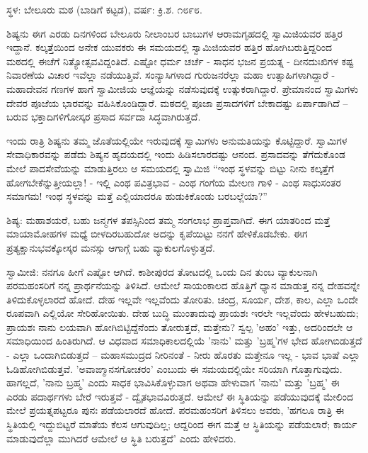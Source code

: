 \begin{center}
ಸ್ಥಳ: ಬೇಲೂರು ಮಠ (ಬಾಡಿಗೆ ಕಟ್ಟಡ), ವರ್ಷ: ಕ್ರಿ.ಶ. ೧೮೯೮.
\end{center}

ಶಿಷ್ಯನು ಈಗ ಎರಡು ದಿನಗಳಿಂದ ಬೇಲೂರು ನೀಲಾಂಬರ ಬಾಬುಗಳ ಆರಾಮಗೃಹದಲ್ಲಿ ಸ್ವಾಮಿಜಿಯವರ ಹತ್ತಿರ ಇದ್ದಾನೆ. ಕಲ್ಕತ್ತೆಯಿಂದ ಅನೇಕ ಯುವಕರು ಈ ಸಮಯದಲ್ಲಿ ಸ್ವಾಮಿಜಿಯವರ ಹತ್ತಿರ ಹೋಗಿಬರುತ್ತಿದ್ದರಿಂದ ಮಠದಲ್ಲಿ ಈಚೆಗೆ ನಿತ್ಯೋತ್ಸವವಿದ್ದಂತಿದೆ. ಎಷ್ಟೋ ಧರ್ಮ ಚರ್ಚೆ - ಸಾಧನ ಭಜನ ಪ್ರಯತ್ನ - ದೀನದುಃಖಿಗಳ ಕಷ್ಟ ನಿವಾರಣೆಯ ವಿಚಾರ ಇವೆಲ್ಲಾ ನಡೆಯುತ್ತಿವೆ. ಸಂನ್ಯಾಸಿಗಳಾದ ಗುರುಜನರೆಲ್ಲಾ ಮಹಾ ಉತ್ಸಾಹಿಗಳಾಗಿದ್ದಾರೆ - ಮಹಾದೇವನ ಗಣಗಳ ಹಾಗೆ ಸ್ವಾಮೀಜಿಯ ಆಜ್ಞೆಯನ್ನು ನಡೆಸುವುದಕ್ಕೆ ಉತ್ಸುಕರಾಗಿದ್ದಾರೆ. ಪ್ರೇಮಾನಂದ ಸ್ವಾಮಿಗಳು ದೇವರ ಪೂಜೆಯ ಭಾರವನ್ನು ವಹಿಸಿಕೊಂಡಿದ್ದಾರೆ. ಮಠದಲ್ಲಿ ಪೂಜಾ ಪ್ರಸಾದಗಳಿಗೆ ಬೇಕಾದಷ್ಟು ಏರ್ಪಾಡಾಗಿದೆ – ಬರುವ ಭಕ್ತಾದಿಗಳಿಗೋಸ್ಕರ ಪ್ರಸಾದ ಸರ್ವದಾ ಸಿದ್ಧವಾಗಿರುತ್ತದೆ.

ಇಂದು ರಾತ್ರಿ ಶಿಷ್ಯನು ತಮ್ಮ ಜೊತೆಯಲ್ಲಿಯೇ ಇರುವುದಕ್ಕೆ ಸ್ವಾಮಿಗಳು ಅನುಮತಿಯನ್ನು ಕೊಟ್ಟಿದ್ದಾರೆ. ಸ್ವಾಮಿಗಳ ಸೇವಾಧಿಕಾರವನ್ನು ಪಡೆದು ಶಿಷ್ಯನ ಹೃದಯದಲ್ಲಿ ಇಂದು ಹಿಡಿಸಲಾರದಷ್ಟು ಆನಂದ. ಪ್ರಸಾದವನ್ನು ತೆಗೆದುಕೊಂಡ ಮೇಲೆ ಪಾದಸೇವೆಯನ್ನು ಮಾಡುತ್ತಿರಲು ಆ ಸಮಯದಲ್ಲಿ ಸ್ವಾಮಿಜಿ “ಇಂಥ ಸ್ಥಳವನ್ನು ಬಿಟ್ಟು ನೀನು ಕಲ್ಕತ್ತೆಗೆ ಹೋಗಬೇಕೆನ್ನುತ್ತೀಯಲ್ಲಾ! - ಇಲ್ಲಿ ಎಂಥ ಪವಿತ್ರಭಾವ - ಎಂಥ ಗಂಗೆಯ ಮೇಲಣ ಗಾಳಿ - ಎಂಥ ಸಾಧುಸಂತರ ಸಮಾಗಮ! ಇಂಥ ಸ್ಥಳವನ್ನು ಮತ್ತೆ ಎಲ್ಲಿಯಾದರೂ ಹುಡುಕಿಕೊಂಡು ಬರಬಲ್ಲೆಯಾ?”

ಶಿಷ್ಯ: ಮಹಾಶಯರೆ, ಬಹು ಜನ್ಮಗಳ ತಪಸ್ಸಿನಿಂದ ತಮ್ಮ ಸಂಗಲಾಭ ಪ್ರಾಪ್ತವಾಗಿದೆ. ಈಗ ಯಾತರಿಂದ ಮತ್ತೆ ಮಾಯಾಮೋಹಗಳ ಮಧ್ಯೆ ಬೀಳದಿರಬಹುದೋ ಅದನ್ನು ಕೃಪೆಯಿಟ್ಟು ನನಗೆ ಹೇಳಿಕೊಡಬೇಕು. ಈಗ ಪ್ರತ್ಯಕ್ಷಾನುಭವಕ್ಕೋಸ್ಕರ ಮನಸ್ಸು ಆಗಾಗ್ಗೆ ಬಹು ವ್ಯಾಕುಲಗೊಳ್ಳುತ್ತದೆ.

ಸ್ವಾಮೀಜಿ: ನನಗೂ ಹೀಗೆ ಎಷ್ಟೋ ಆಗಿದೆ. ಕಾಶೀಪುರದ ತೋಟದಲ್ಲಿ ಒಂದು ದಿನ ತುಂಬ ವ್ಯಾಕುಲನಾಗಿ ಪರಮಹಂಸರಿಗೆ ನನ್ನ ಪ್ರಾರ್ಥನೆಯನ್ನು ತಿಳಿಸಿದೆ. ಆಮೇಲೆ ಸಾಯಂಕಾಲದ ಹೊತ್ತಿಗೆ ಧ್ಯಾನ ಮಾಡುತ್ತ ನನ್ನ ದೇಹವನ್ನೇ ತಿಳಿದುಕೊಳ್ಳಲಾರದೆ ಹೋದೆ. ದೇಹ ಇಲ್ಲವೇ ಇಲ್ಲವೆಂದು ತೋರಿತು. ಚಂದ್ರ, ಸೂರ್ಯ, ದೇಶ, ಕಾಲ, ಎಲ್ಲಾ ಒಂದೇ ರೂಪವಾಗಿ ಎಲ್ಲಿಯೋ ಸೇರಿಹೋಯಿತು. ದೇಹ ಬುದ್ಧಿ ಮುಂತಾದುವು ಪ್ರಾಯಶಃ ಇರಲೇ ಇಲ್ಲವೆಂದು ಹೇಳಬಹುದು; ಪ್ರಾಯಶಃ ನಾನು ಲಯವಾಗಿ ಹೋಗಿಬಿಟ್ಟಿದ್ದೆನೆಂದು ತೋರುತ್ತದೆ, ಮತ್ತೇನು? ಸ್ವಲ್ಪ 'ಅಹಂ' ಇತ್ತು, ಅದರಿಂದಲೇ ಆ ಸಮಾಧಿಯಿಂದ ಹಿಂತಿರುಗಿದೆ. ಆ ವಿಧವಾದ ಸಮಾಧಿಕಾಲದಲ್ಲಿಯೆ 'ನಾನು' ಮತ್ತು 'ಬ್ರಹ್ಮ'ಗಳ ಭೇದ ಹೋಗಿಬಿಡುತ್ತದೆ - ಎಲ್ಲಾ ಒಂದಾಗಿಬಿಡುತ್ತದೆ – ಮಹಾಸಮುದ್ರದ ನೀರಿನಂತೆ - ನೀರು ಹೊರತು ಮತ್ತೇನೂ ಇಲ್ಲ - ಭಾವ ಭಾಷೆ ಎಲ್ಲಾ ಓಡಿಹೋಗಿಬಿಡುತ್ತವೆ. 'ಅವಾಙ್ಮಾನಸಗೋಚರಂ' ಎಂಬುದು ಈ ಸಮಯದಲ್ಲಿಯೇ ಸರಿಯಾಗಿ ಗೊತ್ತಾಗುವುದು. ಹಾಗಲ್ಲದೆ, 'ನಾನು ಬ್ರಹ್ಮ' ಎಂದು ಸಾಧಕ ಭಾವಿಸಿಕೊಳ್ಳುವಾಗ ಅಥವಾ ಹೇಳುವಾಗ 'ನಾನು' ಮತ್ತು 'ಬ್ರಹ್ಮ' ಈ ಎರಡು ಪದಾರ್ಥಗಳು ಬೇರೆ ಇರುತ್ತವೆ - ದ್ವೈತಭಾವವಿರುತ್ತದೆ. ಆಮೇಲೆ ಈ ಸ್ಥಿತಿಯನ್ನು ಪಡೆಯುವುದಕ್ಕೆ ಮೇಲಿಂದ ಮೇಲೆ ಪ್ರಯತ್ನಪಟ್ಟರೂ ಪುನಃ ಪಡೆಯಲಾರದೆ ಹೋದೆ. ಪರಮಹಂಸರಿಗೆ ತಿಳಿಸಲು ಅವರು, 'ಹಗಲೂ ರಾತ್ರಿ ಈ ಸ್ಥಿತಿಯಲ್ಲಿ ಇದ್ದುಬಿಟ್ಟರೆ ಮಾತೆಯ ಕೆಲಸ ಆಗುವುದಿಲ್ಲ; ಆದ್ದರಿಂದ ಈಗ ಮತ್ತೆ ಆ ಸ್ಥಿತಿಯನ್ನು ಪಡೆಯಲಾರೆ; ಕಾರ್ಯ ಮಾಡುವುದೆಲ್ಲಾ ಮುಗಿದರೆ ಆಮೇಲೆ ಆ ಸ್ಥಿತಿ ಬರುತ್ತದೆ' ಎಂದು ಹೇಳಿದರು.

